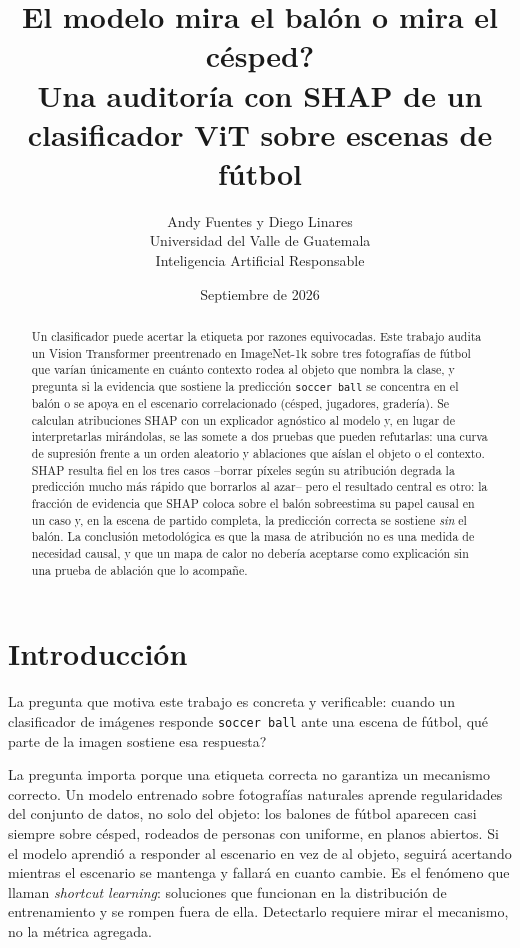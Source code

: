\documentclass[11pt]{article}
\title{\textbf{\textquestiondown{}El modelo mira el balón o mira el césped?}\\[2mm]
\large Una auditoría con SHAP de un clasificador ViT sobre escenas de fútbol}
\author{Andy Fuentes y Diego Linares\\
\small Universidad del Valle de Guatemala \\
\small Inteligencia Artificial Responsable}
\date{Septiembre de 2026}
\begin{document}
\maketitle

\begin{abstract}
\noindent
Un clasificador puede acertar la etiqueta por razones equivocadas. Este trabajo
audita un Vision Transformer preentrenado en ImageNet-1k \citep{dosovitskiy2021image}
sobre tres fotografías de fútbol que varían únicamente en cuánto contexto rodea al
objeto que nombra la clase, y pregunta si la evidencia que sostiene la predicción
\texttt{soccer ball} se concentra en el balón o se apoya en el escenario correlacionado
(césped, jugadores, gradería). Se calculan atribuciones SHAP con un explicador
agnóstico al modelo y, en lugar de interpretarlas mirándolas, se las somete a dos
pruebas que pueden refutarlas: una curva de supresión frente a un orden aleatorio y
ablaciones que aíslan el objeto o el contexto. SHAP resulta fiel en los tres casos
--borrar píxeles según su atribución degrada la predicción mucho más rápido que
borrarlos al azar-- pero el resultado central es otro: la fracción de evidencia que
SHAP coloca sobre el balón sobreestima su papel causal en un caso y, en la escena
de partido completa, la predicción correcta se sostiene \emph{sin} el balón. La
conclusión metodológica es que la masa de atribución no es una medida de necesidad
causal, y que un mapa de calor no debería aceptarse como explicación sin una prueba
de ablación que lo acompañe.
\end{abstract}

\section{Introducción}

La pregunta que motiva este trabajo es concreta y verificable: cuando un
clasificador de imágenes responde \texttt{soccer ball} ante una escena de fútbol,
\textquestiondown{}qué parte de la imagen sostiene esa respuesta?

La pregunta importa porque una etiqueta correcta no garantiza un mecanismo correcto.
Un modelo entrenado sobre fotografías naturales aprende regularidades del conjunto de
datos, no solo del objeto: los balones de fútbol aparecen casi siempre sobre césped,
rodeados de personas con uniforme, en planos abiertos. Si el modelo aprendió a
responder al escenario en vez de al objeto, seguirá acertando mientras el escenario
se mantenga y fallará en cuanto cambie. Es el fenómeno que \citet{geirhos2020shortcut}
llaman \emph{shortcut learning}: soluciones que funcionan en la distribución de
entrenamiento y se rompen fuera de ella. Detectarlo requiere mirar el mecanismo, no
la métrica agregada.
\end{document}
